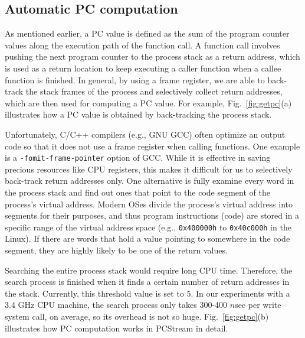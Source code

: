 \vspace{-5pt}
\subsection{Automatic PC computation}
As mentioned earlier, a PC value is defined as the sum of the program counter
values along the execution path of the function call.  A function call involves
pushing the next program counter to the process stack as a return address,
which  is used as a return location to keep executing a caller function when a
callee function is finished.  In general, by using a frame register, we are
able to back-track the stack frames of the process and selectively collect
return addresses, which are then used for computing a PC value. For example,
Fig.~\ref{fig:getpc}(a) illustrates how a PC value is obtained by
back-tracking the process stack.

Unfortunately, C/C++ compilers (e.g., GNU GCC) often optimize an output code so
that it does not use a frame register when calling functions.  One example is a
{\tt -fomit-frame-pointer} option of GCC. While it is effective in saving
precious resources like CPU registers, this makes it difficult for us to
selectively back-track return addresses only. One alternative is fully examine
every word in the process stack and find out ones that point to the code
segment of the process's virtual address.  Modern OSes divide the process's
virtual address into segments for their purposes, and thus program instructions
(code) are stored in a specific range of the virtual address space (e.g.,
{\texttt{0x400000h}} to {\texttt{0x40c000h}} in the
Linux).  If there are words that hold a value pointing to somewhere in the code
segment, they are highly likely to be one of the return values.  

Searching the entire process stack would require long CPU time. Therefore, the
search process is finished when it finds a certain number of return addresses
in the stack. Currently, this threshold value is set to 5.  In our experiments
with a 3.4 GHz CPU machine, the search process only takes 300-400 $n$sec per
write system call, on average, so its overhead is not so huge.
Fig.~\ref{fig:getpc}(b) illustrates how PC computation works in {\sf PCStream} in
detail.

